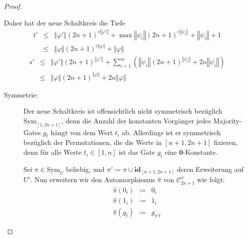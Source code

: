 \begin{proof}
\begin{casenv}
Daher hat der neue Schaltkreis die Tiefe
\begin{eqnarray*}
t' & \leqslant & \left\Vert \varphi'\right\Vert \left(2n+1\right)^{c\left\Vert \varphi'\right\Vert }+\max\left\Vert \psi_{i}\right\Vert \left(2n+1\right)^{c\left\Vert \psi_{i}\right\Vert }+\left\Vert \psi_{i}\right\Vert +1\\
 & \leqslant & \left\Vert \varphi\right\Vert \left(2n+1\right)^{c\left\Vert \varphi\right\Vert }+\left\Vert \varphi\right\Vert 
\end{eqnarray*}
\begin{eqnarray*}
s' & \leqslant & \left\Vert \varphi'\right\Vert \left(2n+1\right)^{\left\Vert \varphi'\right\Vert }+\sum_{i=1}^{m}\left(\left\Vert \psi_{i}\right\Vert \left(2n+1\right)^{\left\Vert \psi_{i}\right\Vert }+2n\left\Vert \psi_{i}\right\Vert \right)\\
 & \leqslant & \left\Vert \varphi\right\Vert \left(2n+1\right)^{\left\Vert \varphi\right\Vert }+2n\left\Vert \varphi\right\Vert 
\end{eqnarray*}

\end{casenv}
\begin{description}
\item [{Symmetrie:}] Der neue Schaltkreis ist offensichtlich nicht symmetrisch
bezüglich $\mathrm{Sym}_{\left[1,2n+1\right]}$, denn die Anzahl der
konstanten Vorgänger jedes Majority-Gates $g_{\bar{t}}$ hängt von
dem Wert $t_{i}$ ab. Allerdings ist er symmetrisch bezüglich der
Permutationen, die die Werte in $\left[n+1,2n+1\right]$ fixieren,
denn für alle Werte $t_{i}\in\left[1,n\right]$ ist das Gate $g_{\bar{t}}$
eine $\mathbf{0}$-Konstante. 

Sei $\pi\in\mathrm{Sym}_{U}$ beliebig, und $\pi'\coloneqq\pi\cup\mathbf{id}_{\left[n+1,2n+1\right]}$
deren Erweiterung auf $U'$. Nun erweitern wir den Automorphismus
$\hat{\pi}$ von $\mathcal{C}_{2n+1}^{\psi}$ wie folgt: 
\begin{eqnarray*}
\hat{\pi}\left(0_{i}\right) & \coloneqq & 0_{i}\\
\hat{\pi}\left(1_{i}\right) & \coloneqq & 1_{i}\\
\hat{\pi}\left(g_{\bar{t}}\right) & \coloneqq & g_{\pi'\bar{t}}
\end{eqnarray*}


\end{description}
\end{proof}
